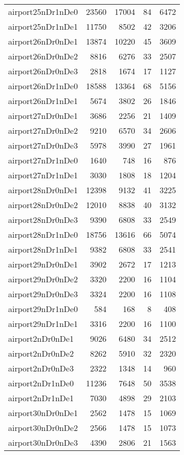 \begin{tabular}{lrrrr}
airport25nDr1nDe0 & 23560 & 17004 & 84 & 6472 \\
airport25nDr1nDe1 & 11750 & 8502 & 42 & 3206 \\
airport26nDr0nDe1 & 13874 & 10220 & 45 & 3609 \\
airport26nDr0nDe2 & 8816 & 6276 & 33 & 2507 \\
airport26nDr0nDe3 & 2818 & 1674 & 17 & 1127 \\
airport26nDr1nDe0 & 18588 & 13364 & 68 & 5156 \\
airport26nDr1nDe1 & 5674 & 3802 & 26 & 1846 \\
airport27nDr0nDe1 & 3686 & 2256 & 21 & 1409 \\
airport27nDr0nDe2 & 9210 & 6570 & 34 & 2606 \\
airport27nDr0nDe3 & 5978 & 3990 & 27 & 1961 \\
airport27nDr1nDe0 & 1640 & 748 & 16 & 876 \\
airport27nDr1nDe1 & 3030 & 1808 & 18 & 1204 \\
airport28nDr0nDe1 & 12398 & 9132 & 41 & 3225 \\
airport28nDr0nDe2 & 12010 & 8838 & 40 & 3132 \\
airport28nDr0nDe3 & 9390 & 6808 & 33 & 2549 \\
airport28nDr1nDe0 & 18756 & 13616 & 66 & 5074 \\
airport28nDr1nDe1 & 9382 & 6808 & 33 & 2541 \\
airport29nDr0nDe1 & 3902 & 2672 & 17 & 1213 \\
airport29nDr0nDe2 & 3320 & 2200 & 16 & 1104 \\
airport29nDr0nDe3 & 3324 & 2200 & 16 & 1108 \\
airport29nDr1nDe0 & 584 & 168 & 8 & 408 \\
airport29nDr1nDe1 & 3316 & 2200 & 16 & 1100 \\
airport2nDr0nDe1 & 9026 & 6480 & 34 & 2512 \\
airport2nDr0nDe2 & 8262 & 5910 & 32 & 2320 \\
airport2nDr0nDe3 & 2322 & 1348 & 14 & 960 \\
airport2nDr1nDe0 & 11236 & 7648 & 50 & 3538 \\
airport2nDr1nDe1 & 7030 & 4898 & 29 & 2103 \\
airport30nDr0nDe1 & 2562 & 1478 & 15 & 1069 \\
airport30nDr0nDe2 & 2566 & 1478 & 15 & 1073 \\
airport30nDr0nDe3 & 4390 & 2806 & 21 & 1563 \\

\end{tabular}
